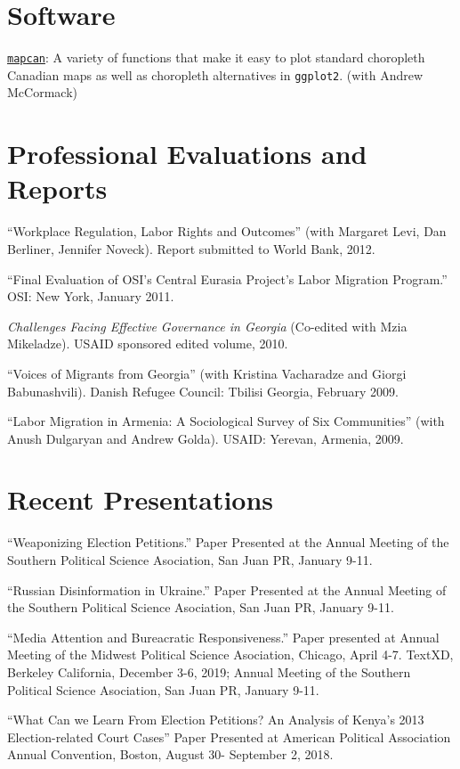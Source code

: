 \documentclass[margin,line]{res}
\begin{document}
{\begin{resume}
\section{\sc Software}
\href{https://CRAN.R-project.org/package=mapcan}{\texttt{mapcan}}:
A variety of functions that make it easy to plot standard choropleth
Canadian maps as well as choropleth alternatives in \texttt{ggplot2}. (with
Andrew McCormack)


\section{\sc Professional Evaluations and Reports}

 ``Workplace Regulation, Labor Rights and Outcomes'' (with Margaret Levi, Dan Berliner, Jennifer Noveck). Report submitted to World Bank,  2012. 

``Final Evaluation of OSI's Central Eurasia Project's Labor Migration
Program.'' OSI: New York, January 2011. 

\emph{Challenges Facing Effective Governance in Georgia} (Co-edited
with Mzia Mikeladze). USAID sponsored edited volume, 2010.

``Voices of Migrants
from Georgia''  (with Kristina Vacharadze and Giorgi Babunashvili).
Danish Refugee Council: Tbilisi Georgia, February 2009.

``Labor Migration in Armenia:
A Sociological Survey of Six Communities'' (with Anush Dulgaryan and
Andrew Golda).  USAID: Yerevan, Armenia, 2009.

\section{\sc Recent Presentations}
%

``Weaponizing Election Petitions.''  Paper Presented at the Annual Meeting of the
Southern Political Science Asociation,  San Juan PR, January 9-11.

``Russian Disinformation in Ukraine.'' Paper Presented at the Annual Meeting of the
Southern Political Science Asociation,  San Juan PR, January 9-11.

``Media Attention and Bureacratic Responsiveness.''  Paper presented
at Annual Meeting of the
Midwest Political Science Asociation,  Chicago, April 4-7.
TextXD, Berkeley California, December 3-6, 2019; Annual Meeting of the
Southern Political Science Asociation,  San Juan PR, January 9-11.

``What Can we Learn From Election Petitions? An Analysis of Kenya's
2013 Election-related Court Cases''  Paper Presented at
American Political Association Annual Convention, Boston, August 30-
September 2, 2018.


\end{resume}}
\end{document}
